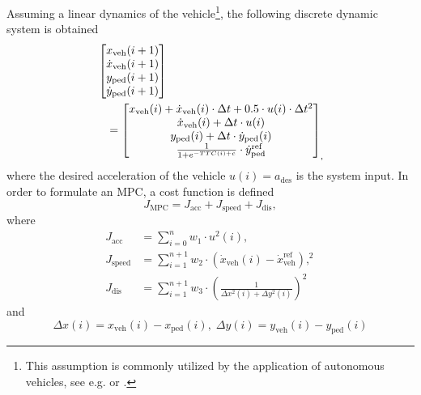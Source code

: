 \documentclass[conference]{IEEEtran}
\begin{document}
	Assuming a linear dynamics of the vehicle\footnote{This assumption is commonly utilized by the application of autonomous vehicles, see e.g. \cite{2016_RecheneffizienteTrajektorienoptimierungFur_gutjahr} or \cite[Chapter 13]{2017_ModernRoboticsMechanics_lynch}.}, the following discrete dynamic system is obtained
	\begin{align}\label{eq:explicit_dyn_model_ofMPC} \nonumber
		&\begin{bmatrix}
			x_\mathrm{veh}(i+1) \\
			\dot x_\mathrm{veh}(i+1)\\
			y_\mathrm{ped}(i+1) \\
			\dot{y}_\mathrm{ped}(i+1)
		\end{bmatrix} \\
		&\hspace*{3mm}=
		\begin{bmatrix}
			x_\mathrm{veh}(i) + \dot x_\mathrm{veh}(i) \cdot {\Delta}t + 0.5 \cdot u(i) \cdot {\Delta}t^{2} \\
			\dot x_\mathrm{veh}(i) + \Delta t \cdot u(i) \\
			y_\mathrm{ped}(i) + \Delta t \cdot \dot y_\mathrm{ped}(i) \\
			\frac{1}{1 + e^{-TTC(i)+c}} \cdot \dot y_\mathrm{ped}^\mathrm{ref}
		\end{bmatrix}_{\Huge ,}
	\end{align}
	where the desired acceleration of the vehicle $u(i)=a_\mathrm{des}$ is the system input. In order to formulate an MPC, a cost function is defined
	\begin{equation} \label{eq:MPC_explicit_cost}
		J_\mathrm{MPC} = J_\mathrm{acc} + J_\mathrm{speed} + J_\mathrm{dis},
	\end{equation}
	where
	\begin{subequations} \label{eq:J_of_MPC}
		\begin{align}
			J_\mathrm{acc} &= \sum_{i=0}^{n} w_{1} \cdot u^{2}(i), \\
			J_\mathrm{speed} &= \sum_{i=1}^{n+1} w_{2} \cdot (\dot x_\mathrm{veh}(i) - \dot x_\mathrm{veh}^\mathrm{ref}),^2 \\
			J_\mathrm{dis} &= \sum_{i=1}^{n+1} w_{3} \cdot \left(\frac{1} {\Delta x^2(i) +  \Delta y^2(i)}\right)^2
		\end{align}
	\end{subequations}
	and 
	\begin{equation} \label{eq:dist_computation}	
		\Delta x(i) = x_\mathrm{veh}(i) - x_\mathrm{ped}(i), \; \Delta y(i) = y_\mathrm{veh}(i) - y_\mathrm{ped}(i)
	\end{equation}
\end{document}
